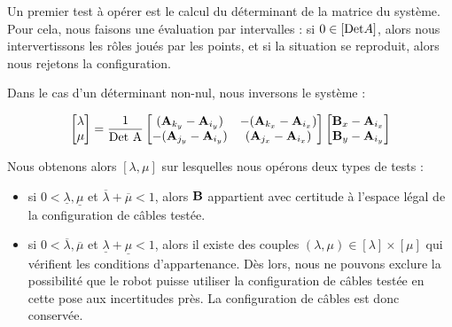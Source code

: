 Un premier test \`a op\'erer est le calcul du d\'eterminant de la matrice du 
syst\`eme. Pour cela, nous faisons une \'evaluation par intervalles : si $0 \in 
[\hbox{Det}A]$, alors nous intervertissons les r\^oles jou\'es par les points, 
et si la situation se reproduit, alors nous rejetons la configuration.

Dans le cas d'un d\'eterminant non-nul, nous inversons le syst\`eme :

\begin{equation}
\begin{bmatrix}
\lambda \\
\mu
\end{bmatrix} = \frac 1 {\hbox{Det A}}
\begin{bmatrix}
({\bf A}_{k_y} - {\bf A}_{i_y}) & -({\bf A}_{k_x} 
- {\bf A}_{i_x}) \\
-({\bf A}_{j_y} - {\bf A}_{i_y}) & ({\bf A}_{j_x} - {\bf A}_{i_x}) 
\end{bmatrix}
\begin{bmatrix}
{\bf B}_{x} - {\bf A}_{i_x} \\
{\bf B}_{y} - {\bf A}_{i_y}
\end{bmatrix}
\label{chap03:eq19}
\end{equation}

Nous obtenons alors $[\lambda, \mu]$ sur lesquelles nous op\'erons deux types 
de tests :
\begin{itemize}
 \item si $0 < \underline{\lambda}, \underline{\mu}$ et $\overline{\lambda} + 
\overline{\mu} < 1$, alors $\bf B$ appartient avec certitude \`a l'espace 
l\'egal de la configuration de c\^ables test\'ee.
 \item si $0 < \overline{\lambda}, \overline{\mu}$ et $\underline{\lambda} + 
\underline{\mu} < 1$, alors il existe des couples $(\lambda, \mu) \in 
[\lambda]\times[\mu]$ qui v\'erifient les conditions d'appartenance. D\`es 
lors, nous ne pouvons exclure la possibilit\'e que le robot puisse utiliser la 
configuration de c\^ables test\'ee en cette pose aux incertitudes pr\`es. La 
configuration de c\^ables est donc conserv\'ee.
\end{itemize}


